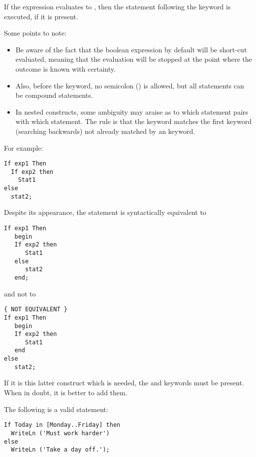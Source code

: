 If the expression evaluates to , then the statement following
the  keyword is executed, if it is present.

Some points to note:
\begin{itemize}
\item 
Be aware of the fact that the boolean expression by default will be 
short-cut evaluated, meaning that the evaluation will be stopped at 
the point where the  outcome is known with certainty.
\item
Also, before the  keyword, no semicolon (\var{;}) is allowed,
but all statements can be compound statements.
\item
In nested  constructs, some ambiguity may araise as
to which   statement pairs with which  statement. The rule
is that the  keyword matches the first  keyword
(searching backwards) not already matched by an  keyword.
\end{itemize}
For example:
\begin{verbatim}
If exp1 Then
  If exp2 then
    Stat1
else
  stat2;
\end{verbatim}
Despite its appearance, the statement is syntactically equivalent to
\begin{verbatim}
If exp1 Then
   begin
   If exp2 then
      Stat1
   else
      stat2
   end;
\end{verbatim}
and not to
\begin{verbatim}
{ NOT EQUIVALENT }
If exp1 Then
   begin
   If exp2 then
      Stat1
   end
else
   stat2;
\end{verbatim}
If it is this latter construct which is needed, the  and 
keywords must be present. When in doubt, it is better to add them.

The following is a valid statement:
\begin{verbatim}
If Today in [Monday..Friday] then
  WriteLn ('Must work harder')
else
  WriteLn ('Take a day off.');
\end{verbatim}

